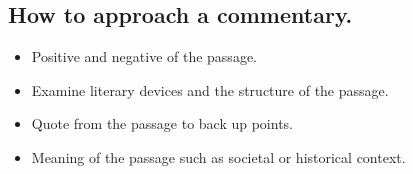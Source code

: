 \documentclass[12pt]{article}
\begin{document}
\subsection*{How to approach a commentary.}

\begin{itemize}
  \item{Positive and negative of the passage.}
  \item{Examine literary devices and the structure of the passage.}
  \item{Quote from the passage to back up points.}
  \item{Meaning of the passage such as societal or historical context.}
\end{itemize}
\end{document}
